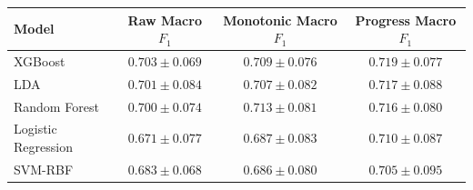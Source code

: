 \begin{tabular}{lccc}
\toprule
Model & Raw Macro $F_1$ & Monotonic Macro $F_1$ & Progress Macro $F_1$ \\
\midrule
XGBoost & $0.703 \pm 0.069$ & $0.709 \pm 0.076$ & $0.719 \pm 0.077$ \\
LDA & $0.701 \pm 0.084$ & $0.707 \pm 0.082$ & $0.717 \pm 0.088$ \\
Random Forest & $0.700 \pm 0.074$ & $0.713 \pm 0.081$ & $0.716 \pm 0.080$ \\
Logistic Regression & $0.671 \pm 0.077$ & $0.687 \pm 0.083$ & $0.710 \pm 0.087$ \\
SVM-RBF & $0.683 \pm 0.068$ & $0.686 \pm 0.080$ & $0.705 \pm 0.095$ \\
\bottomrule
\end{tabular}
